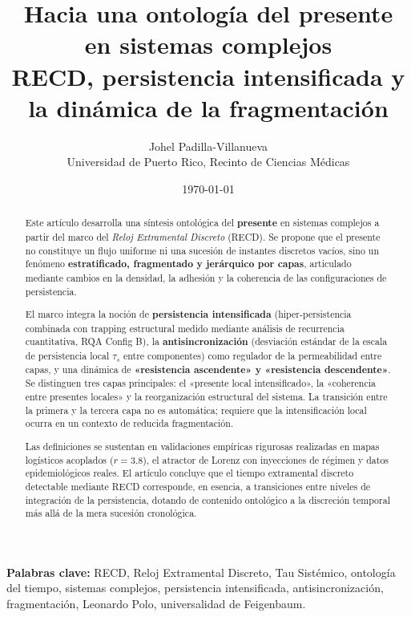 \documentclass[11pt,a4paper]{article}
\title{\textbf{Hacia una ontología del presente en sistemas complejos}\\[0.3em]
\large RECD, persistencia intensificada y la dinámica de la fragmentación}
\author{Johel Padilla-Villanueva\\
\small Universidad de Puerto Rico, Recinto de Ciencias Médicas}
\date{\today}
\begin{document}
\maketitle

\begin{abstract}
Este artículo desarrolla una síntesis ontológica del \textbf{presente} en sistemas complejos a partir del marco del \textit{Reloj Extramental Discreto} (RECD). Se propone que el presente no constituye un flujo uniforme ni una sucesión de instantes discretos vacíos, sino un fenómeno \textbf{estratificado, fragmentado y jerárquico por capas}, articulado mediante cambios en la densidad, la adhesión y la coherencia de las configuraciones de persistencia.

El marco integra la noción de \textbf{persistencia intensificada} (hiper-persistencia combinada con trapping estructural medido mediante análisis de recurrencia cuantitativa, RQA Config B), la \textbf{antisincronización} (desviación estándar de la escala de persistencia local $\tau_s$ entre componentes) como regulador de la permeabilidad entre capas, y una dinámica de \textbf{«resistencia ascendente» y «resistencia descendente»}. Se distinguen tres capas principales: el «presente local intensificado», la «coherencia entre presentes locales» y la reorganización estructural del sistema. La transición entre la primera y la tercera capa no es automática; requiere que la intensificación local ocurra en un contexto de reducida fragmentación.

Las definiciones se sustentan en validaciones empíricas rigurosas realizadas en mapas logísticos acoplados ($r=3.8$), el atractor de Lorenz con inyecciones de régimen y datos epidemiológicos reales. El artículo concluye que el tiempo extramental discreto detectable mediante RECD corresponde, en esencia, a transiciones entre niveles de integración de la persistencia, dotando de contenido ontológico a la discreción temporal más allá de la mera sucesión cronológica.
\end{abstract}

\noindent\textbf{Palabras clave:} RECD, Reloj Extramental Discreto, Tau Sistémico, ontología del tiempo, sistemas complejos, persistencia intensificada, antisincronización, fragmentación, Leonardo Polo, universalidad de Feigenbaum.

\newpage
\tableofcontents
\newpage
\end{document}
